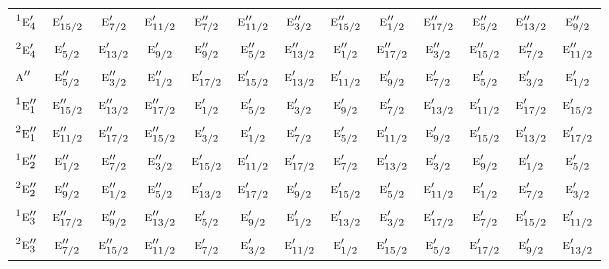 \documentclass[10pt,a4paper]{article}
\numberwithin{equation}{section}
\newcommand{\irr}[1]{\text{\normalfont\scshape #1}}
\newcommand{\conjpair}[1]{{}^{#1}}
\begin{document}
{\begin{longtable}{@{}lcccccccccccc@{}}
$\conjpair{1}\irr{e}_{4}'$ & $\irr{e}_{15/2}'$ & $\irr{e}_{7/2}'$ & $\irr{e}_{11/2}'$ & $\irr{e}_{7/2}''$ & $\irr{e}_{11/2}''$ & $\irr{e}_{3/2}''$ & $\irr{e}_{15/2}''$ & $\irr{e}_{1/2}''$ & $\irr{e}_{17/2}''$ & $\irr{e}_{5/2}''$ & $\irr{e}_{13/2}''$ & $\irr{e}_{9/2}''$\\
$\conjpair{2}\irr{e}_{4}'$ & $\irr{e}_{5/2}'$ & $\irr{e}_{13/2}'$ & $\irr{e}_{9/2}'$ & $\irr{e}_{9/2}''$ & $\irr{e}_{5/2}''$ & $\irr{e}_{13/2}''$ & $\irr{e}_{1/2}''$ & $\irr{e}_{17/2}''$ & $\irr{e}_{3/2}''$ & $\irr{e}_{15/2}''$ & $\irr{e}_{7/2}''$ & $\irr{e}_{11/2}''$\\
$\irr{a}''$ & $\irr{e}_{5/2}''$ & $\irr{e}_{3/2}''$ & $\irr{e}_{1/2}''$ & $\irr{e}_{17/2}'$ & $\irr{e}_{15/2}'$ & $\irr{e}_{13/2}'$ & $\irr{e}_{11/2}'$ & $\irr{e}_{9/2}'$ & $\irr{e}_{7/2}'$ & $\irr{e}_{5/2}'$ & $\irr{e}_{3/2}'$ & $\irr{e}_{1/2}'$\\
$\conjpair{1}\irr{e}_{1}''$ & $\irr{e}_{15/2}''$ & $\irr{e}_{13/2}''$ & $\irr{e}_{17/2}''$ & $\irr{e}_{1/2}'$ & $\irr{e}_{5/2}'$ & $\irr{e}_{3/2}'$ & $\irr{e}_{9/2}'$ & $\irr{e}_{7/2}'$ & $\irr{e}_{13/2}'$ & $\irr{e}_{11/2}'$ & $\irr{e}_{17/2}'$ & $\irr{e}_{15/2}'$\\
$\conjpair{2}\irr{e}_{1}''$ & $\irr{e}_{11/2}''$ & $\irr{e}_{17/2}''$ & $\irr{e}_{15/2}''$ & $\irr{e}_{3/2}'$ & $\irr{e}_{1/2}'$ & $\irr{e}_{7/2}'$ & $\irr{e}_{5/2}'$ & $\irr{e}_{11/2}'$ & $\irr{e}_{9/2}'$ & $\irr{e}_{15/2}'$ & $\irr{e}_{13/2}'$ & $\irr{e}_{17/2}'$\\
$\conjpair{1}\irr{e}_{2}''$ & $\irr{e}_{1/2}''$ & $\irr{e}_{7/2}''$ & $\irr{e}_{3/2}''$ & $\irr{e}_{15/2}'$ & $\irr{e}_{11/2}'$ & $\irr{e}_{17/2}'$ & $\irr{e}_{7/2}'$ & $\irr{e}_{13/2}'$ & $\irr{e}_{3/2}'$ & $\irr{e}_{9/2}'$ & $\irr{e}_{1/2}'$ & $\irr{e}_{5/2}'$\\
$\conjpair{2}\irr{e}_{2}''$ & $\irr{e}_{9/2}''$ & $\irr{e}_{1/2}''$ & $\irr{e}_{5/2}''$ & $\irr{e}_{13/2}'$ & $\irr{e}_{17/2}'$ & $\irr{e}_{9/2}'$ & $\irr{e}_{15/2}'$ & $\irr{e}_{5/2}'$ & $\irr{e}_{11/2}'$ & $\irr{e}_{1/2}'$ & $\irr{e}_{7/2}'$ & $\irr{e}_{3/2}'$\\
$\conjpair{1}\irr{e}_{3}''$ & $\irr{e}_{17/2}''$ & $\irr{e}_{9/2}''$ & $\irr{e}_{13/2}''$ & $\irr{e}_{5/2}'$ & $\irr{e}_{9/2}'$ & $\irr{e}_{1/2}'$ & $\irr{e}_{13/2}'$ & $\irr{e}_{3/2}'$ & $\irr{e}_{17/2}'$ & $\irr{e}_{7/2}'$ & $\irr{e}_{15/2}'$ & $\irr{e}_{11/2}'$\\
$\conjpair{2}\irr{e}_{3}''$ & $\irr{e}_{7/2}''$ & $\irr{e}_{15/2}''$ & $\irr{e}_{11/2}''$ & $\irr{e}_{7/2}'$ & $\irr{e}_{3/2}'$ & $\irr{e}_{11/2}'$ & $\irr{e}_{1/2}'$ & $\irr{e}_{15/2}'$ & $\irr{e}_{5/2}'$ & $\irr{e}_{17/2}'$ & $\irr{e}_{9/2}'$ & $\irr{e}_{13/2}'$\\

\end{longtable}}
\end{document}
